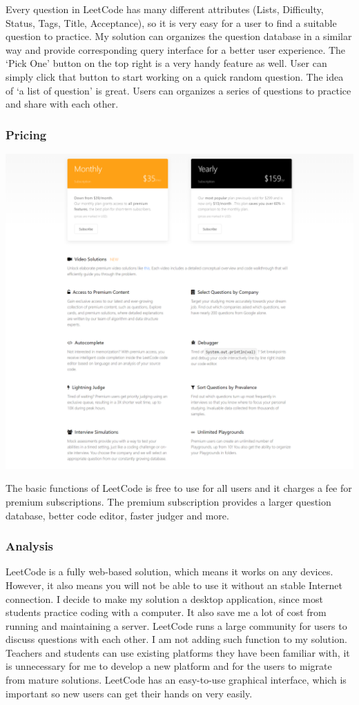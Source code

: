 \documentclass[a4paper]{report}
\begin{document}
Every question in LeetCode has many different attributes (Lists, Difficulty, Status, Tags, Title, Acceptance), so it is very easy for a user to find a suitable question to practice. My solution can organizes the question database in a similar way and provide corresponding query interface for a better user experience. The `Pick One' button on the top right is a very handy feature as well. User can simply click that button to start working on a quick random question. The idea of `a list of question' is great. Users can organizes a series of questions to practice and share with each other.

\subsubsection{Pricing}

\includegraphics[width=\linewidth]{LeetCode-Premium}

The basic functions of LeetCode is free to use for all users and it charges a fee for premium subscriptions. The premium subscription provides a larger question database, better code editor, faster judger and more.

\subsubsection{Analysis}

LeetCode is a fully web-based solution, which means it works on any devices. However, it also means you will not be able to use it without an stable Internet connection. I decide to make my solution a desktop application, since most students practice coding with a computer. It also save me a lot of cost from running and maintaining a server. LeetCode runs a large community for users to discuss questions with each other. I am not adding such function to my solution. Teachers and students can use existing platforms they have been familiar with, it is unnecessary for me to develop a new platform and for the users to migrate from mature solutions. LeetCode has an easy-to-use graphical interface, which is important so new users can get their hands on very easily. 
\end{document}
